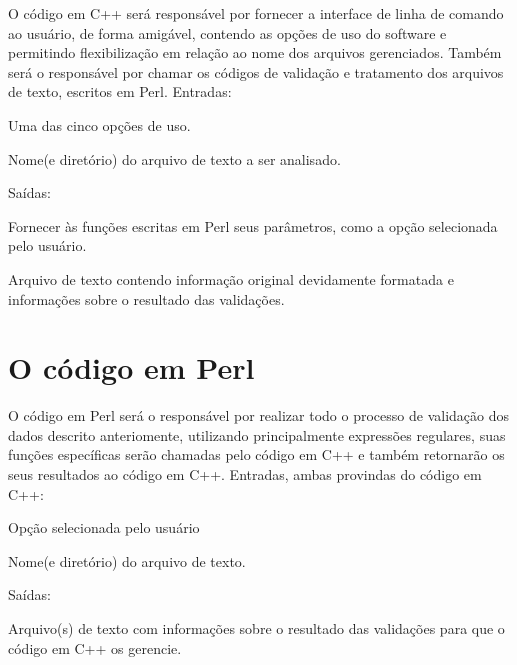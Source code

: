 \documentclass[paper=a4, fontsize=11pt]{scrartcl} %
\numberwithin{equation}{section} %
\numberwithin{figure}{section} %
\numberwithin{table}{section} %
\begin{document}
O código em C++ será responsável por fornecer a interface de linha de comando ao usuário, de forma amigável, contendo as opções de uso do software e permitindo flexibilização em relação ao nome dos arquivos gerenciados. Também será o responsável por chamar os códigos de validação e tratamento dos arquivos de texto, escritos em Perl. Entradas: \begin{enumerate*} \item Uma das cinco opções de uso. \item Nome(e diretório) do arquivo de texto a ser analisado.  \end{enumerate*}  
Saídas: \begin{enumerate*} \item Fornecer às funções escritas em Perl seus parâmetros, como a opção selecionada pelo usuário. \item Arquivo de texto contendo informação original devidamente formatada e informações sobre o resultado das validações.  \end{enumerate*}

\section{O código em Perl}

O código em Perl será o responsável por realizar todo o processo de validação dos dados descrito anteriomente, utilizando principalmente expressões regulares, suas funções específicas serão chamadas pelo código em C++ e também retornarão os seus resultados ao código em C++. Entradas, ambas provindas do código em C++: \begin{enumerate*} \item Opção selecionada pelo usuário \item Nome(e diretório) do arquivo de texto. \end{enumerate*}  
Saídas: \begin{enumerate*} \item Arquivo(s) de texto com informações sobre o resultado das validações para que o código em C++ os gerencie.  \end{enumerate*}
\end{document}
